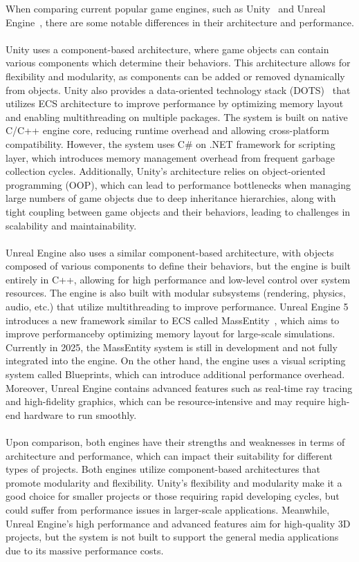 When comparing current popular game engines, such as Unity~\cite{Unity_Engine} and Unreal Engine~\cite{Unreal_Engine}, 
there are some notable differences in their architecture and performance.
\\\\
Unity uses a component-based architecture, where game objects can contain various components which 
determine their behaviors.
This architecture allows for flexibility and modularity, as components can be added or removed dynamically 
from objects.
Unity also provides a data-oriented technology stack (DOTS)~\cite{Unity_DOTS} that utilizes
ECS architecture to improve performance by optimizing memory layout and enabling multithreading on 
multiple packages.
The system is built on native C/C++ engine core, reducing runtime overhead and allowing 
cross-platform compatibility.
However, the system uses C\# on .NET framework for scripting layer, which introduces memory management 
overhead from frequent garbage collection cycles.
Additionally, Unity's architecture relies on object-oriented programming (OOP), which can lead to performance 
bottlenecks when managing large numbers of game objects due to deep inheritance hierarchies, along with 
tight coupling between game objects and their behaviors, leading to challenges in scalability and maintainability.
\\\\
Unreal Engine also uses a similar component-based architecture, with objects composed of various components 
to define their behaviors, but the engine is built entirely in C++, allowing for high 
performance and low-level control over system resources.
The engine is also built with modular subsystems (rendering, physics, audio, etc.) that utilize multithreading 
to improve performance.
Unreal Engine 5 introduces a new framework similar to ECS called MassEntity~\cite{Unreal_MassEntity}, which aims to 
improve performanceby optimizing memory layout for large-scale simulations.
Currently in 2025, the MassEntity system is still in development and not fully integrated into the engine.
On the other hand, the engine uses a visual scripting system called Blueprints, which can introduce additional 
performance overhead.
Moreover, Unreal Engine contains advanced features such as real-time ray tracing and high-fidelity graphics, 
which can be resource-intensive and may require high-end hardware to run smoothly.
\\\\
Upon comparison, both engines have their strengths and weaknesses in terms of architecture and performance, 
which can impact their suitability for different types of projects.
Both engines utilize component-based architectures that promote modularity and flexibility.
Unity's flexibility and modularity make it a good choice for smaller projects or those requiring rapid 
developing cycles, but could suffer from performance issues in larger-scale applications.
Meanwhile, Unreal Engine's high performance and advanced features aim for high-quality 
3D projects, but the system is not built to support the general media applications due to its massive 
performance costs.

